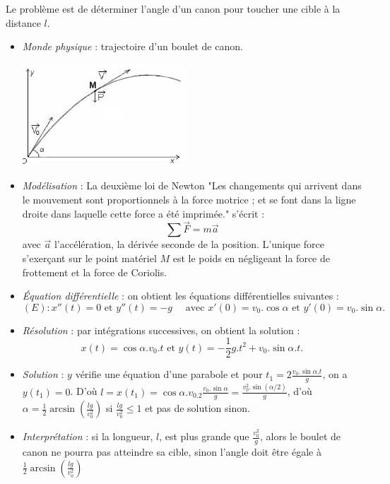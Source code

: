 \documentclass{book}
\begin{document}
\begin{Exemple} Le problème est de déterminer l'angle d'un canon pour toucher une cible à la distance $l$.
\begin{itemize} 
\item \textit{Monde physique} :  trajectoire d'un boulet de canon.
\begin{center}
\includegraphics[width=6cm]{C7_equation_differentielle_parabole.png}
\end{center} 
\item \textit{Modélisation} :  La deuxième loi de Newton "Les changements qui arrivent dans le mouvement sont proportionnels à la force motrice ; et se font dans la ligne droite dans laquelle cette force a été imprimée." s'écrit : $$\sum \vec{F} = m\vec{a}$$ avec $\vec{a}$ l'accélération, la dérivée seconde de la position. L'unique force s'exerçant sur le point matériel $M$ est le poids en négligeant la force de frottement et la force de Coriolis.
\item \textit{Équation différentielle} : on obtient les équations différentielles suivantes :
 $$(E):x''(t) = 0 \text{ et } y''(t) = -g\quad  \text{ avec } x'(0)=v_0.\cos \alpha \text{ et } y'(0)=v_0.\sin \alpha.$$
\item \textit{Résolution} : par intégrations successives, on obtient la solution :
$$ x(t) = \cos \alpha .v_0. t  \text{ et } y(t) =  -\frac 1 2 g.t^2+v_0.\sin \alpha.t.$$
\item \textit{Solution} : $y$ vérifie une équation d'une parabole et pour $t_1=2  \frac{v_0.\sin \alpha. t}{g}$, on a $y(t_1) =0$. D'où $l=x(t_1) = \cos \alpha.v_0.2  \frac{v_0.\sin \alpha }{g}=\frac{v_0^2.\sin (\alpha/2)}{g}$, d'où $\alpha =\frac 1 2 \arcsin(\frac{lg}{v_0 ^2})$ si $\frac{lg}{v_0 ^2}\leq 1$ et pas de solution sinon.
\item  \textit{Interprétation} : si la longueur, $l$, est plus grande que $\frac{v_0 ^2}{g}$, alors le boulet de canon ne pourra pas atteindre sa cible, sinon l'angle doit être égale à  $\frac 1 2 \arcsin(\frac{lg}{v_0 ^2})$ 
\end{itemize}
\end{Exemple}
\end{document}
